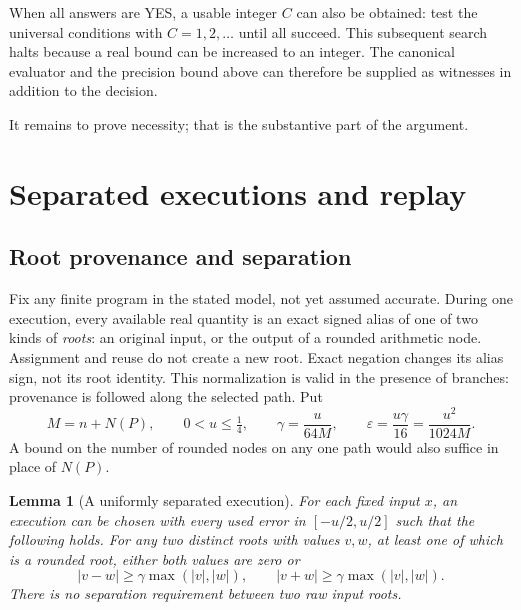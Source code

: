 \documentclass[11pt,a4paper]{article}
\newtheorem{lemma}[theorem]{Lemma}
\theoremstyle{definition}
\theoremstyle{remark}
\newcommand{\abs}[1]{\lvert #1\rvert}
\begin{document}
When all answers are YES, a usable integer $C$ can also be obtained: test the
universal conditions with $C=1,2,\ldots$ until all succeed. This subsequent
search halts because a real bound can be increased to an integer. The
canonical evaluator and the precision bound above can therefore be supplied
as witnesses in addition to the decision.

It remains to prove necessity; that is the substantive part of the argument.

\section{Separated executions and replay}

\subsection{Root provenance and separation}

Fix any finite program in the stated model, not yet assumed accurate. During
one execution, every available real quantity is an exact signed alias of
one of two kinds of \emph{roots}: an original input, or the output of a rounded
arithmetic node. Assignment and reuse do not create a new root. Exact
negation changes its alias sign, not its root identity. This normalization is
valid in the presence of branches: provenance is followed along the selected
path. Put
\begin{equation}\label{eq:constants}
 M=n+N(P),\qquad 0<u\le\tfrac14,\qquad
 \gamma=\frac{u}{64M},\qquad
 \varepsilon=\frac{u\gamma}{16}=\frac{u^2}{1024M}.
\end{equation}
A bound on the number of rounded nodes on any one path would also suffice in
place of $N(P)$.

\begin{lemma}[A uniformly separated execution]\label{lem:sep}
For each fixed input $x$, an execution can be chosen with every used error in
$[-u/2,u/2]$ such that the following holds. For any two distinct roots with
values $v,w$, at least one of which is a rounded root, either both values are
zero or
\begin{equation}\label{eq:sep}
 \abs{v-w}\ge\gamma\max(\abs v,\abs w),\qquad
 \abs{v+w}\ge\gamma\max(\abs v,\abs w).
\end{equation}
There is no separation requirement between two raw input roots.
\end{lemma}
\end{document}

